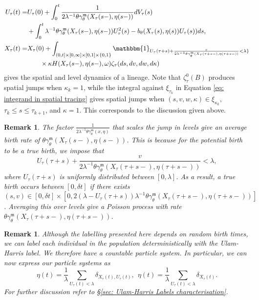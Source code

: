 \documentclass[12pt]{article}
\newtheorem{remark}[theorem]{Remark}
\begin{document}
\begin{align*}
U_{\tau}(t)=&U_{\tau}(0)+\int_{0}^{t}\frac{1}{2\lambda^{-1} \theta \gamma^{\mathfrak{m}}_{\theta}(X_{\tau}(s-), \eta(s-))}dV_{\tau}(s)\\
&+\int_{0}^{t}\lambda^{-1} \theta \gamma^{\mathfrak{m}}_{\theta}(X_{\tau}(s-), \eta(s-))U^2_{\tau}(s)-b_{\theta}(X_{\tau}(s),\eta(s))U_{\tau}(s))ds,\\  
X_{\tau}(t)=&X_{\tau}(0)+\int_{(0,t]\times[0,\infty]\times[0,1]\times\{0,1\}}\mathbbm{1}_{U_{\tau}(\tau+s)+ \frac{v}{2\lambda^{-1} \theta \gamma^{\mathfrak{m}}_{\theta}(X_{\tau}(\tau+s-), \eta(\tau+s-))}<\lambda\}}\\
&\qquad \times \kappa   H(X_{\tau}(s-), \eta(s-),\omega)\zeta_{\tau}(ds,dv,dw,d\kappa)
\end{align*}
gives the spatial and level dynamics of a lineage. Note that $\zeta^{0}_{\tau}(B)$ produces spatial jumps when $\kappa_k=1$, while the integral against $\xi_{\tau_k}$ in Equation \eqref{eq: integrand in spatial tracing} gives spatial jumps when $(s,v,w,\kappa) \in \xi_{\kappa_k}$, $\tau_k \leq s \leq \tau_{k+1}$, and $\kappa = 1$. This corresponds to the discussion given above.
\begin{remark}
The factor $\frac{1}{2\lambda^{-1} \theta \gamma^{\mathfrak{m}}_{\theta}(x, \eta)}$ that scales the jump in levels give an average birth rate of $\theta \gamma^{\mathfrak{m}}_{\theta}(X_{\tau}(s-), \eta(s-))$. This is because for the potential birth to be a true birth, we impose that $$U_{\tau}(\tau+s)+ \frac{v}{2\lambda^{-1} \theta \gamma^{\mathfrak{m}}_{\theta}(X_{\tau}(\tau+s-), \eta(\tau+s-))}< \lambda,$$ where $U_{\tau}(\tau+s)$ is uniformly distributed between $[0, \lambda]$. As a result, a true birth occurs between $[0,\delta t]$ if there exists $(s,v) \in [0,\delta t]\times [0, 2 (\lambda-U_{\tau}(\tau+s)) \lambda^{-1} \theta \gamma^{\mathfrak{m}}_{\theta}(X_{\tau}(\tau+s-), \eta(\tau+s-))]$. Averaging this over levels give a Poisson process with rate $ \theta \gamma^{\mathfrak{m}}_{\theta}(X_{\tau}(\tau+s-), \eta(\tau+s-))$. 
\end{remark}
\begin{remark}
Although the labelling presented here depends on random birth times, we can label each individual in the population deterministically with the Ulam-Harris label. We therefore have a countable particle system. In particular, we can now express our particle systems as
$$\eta(t)=\frac{1}{\lambda}\sum_{U_{\tau}(t) < \lambda} \delta_{X_{\tau}(t),U_{\tau}(t)}, ~~\eta(t)=\frac{1}{\lambda}\sum_{ U_{\tau}(t) < \lambda} \delta_{X_{\tau}(t)}.$$
For further discussion refer to \S \ref{sec: Ulam-Harris Labels characterisation}.
\end{remark}
\end{document}
